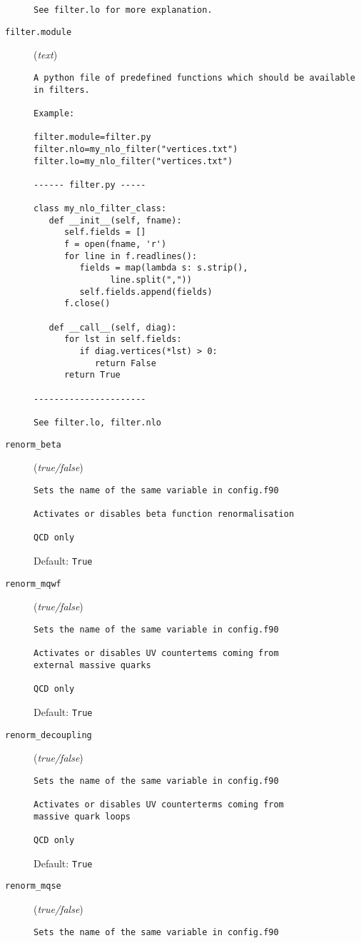 \begin{description}
\begin{verbatim}
See filter.lo for more explanation.
\end{verbatim}
\item[\texttt{filter.module}] (\textit{text})
\begin{verbatim}
A python file of predefined functions which should be available
in filters.

Example:

filter.module=filter.py
filter.nlo=my_nlo_filter("vertices.txt")
filter.lo=my_nlo_filter("vertices.txt")

------ filter.py -----

class my_nlo_filter_class:
   def __init__(self, fname):
      self.fields = []
      f = open(fname, 'r')
      for line in f.readlines():
         fields = map(lambda s: s.strip(),
               line.split(","))
         self.fields.append(fields)
      f.close()

   def __call__(self, diag):
      for lst in self.fields:
         if diag.vertices(*lst) > 0:
            return False
      return True

----------------------

See filter.lo, filter.nlo
\end{verbatim}
\item[\texttt{renorm\_beta}] (\textit{true/false})
\begin{verbatim}
Sets the name of the same variable in config.f90

Activates or disables beta function renormalisation

QCD only
\end{verbatim}
Default: \verb|True|
\item[\texttt{renorm\_mqwf}] (\textit{true/false})
\begin{verbatim}
Sets the name of the same variable in config.f90

Activates or disables UV countertems coming from
external massive quarks

QCD only
\end{verbatim}
Default: \verb|True|
\item[\texttt{renorm\_decoupling}] (\textit{true/false})
\begin{verbatim}
Sets the name of the same variable in config.f90

Activates or disables UV counterterms coming from
massive quark loops

QCD only
\end{verbatim}
Default: \verb|True|
\item[\texttt{renorm\_mqse}] (\textit{true/false})
\begin{verbatim}
Sets the name of the same variable in config.f90


\end{verbatim}
\end{description}
